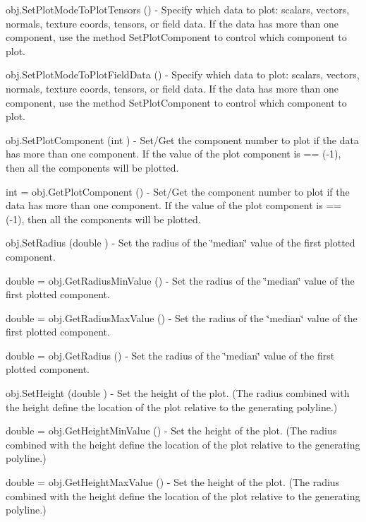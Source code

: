 \begin{DoxyItemize}
\item {\ttfamily obj.\-Set\-Plot\-Mode\-To\-Plot\-Tensors ()} -\/ Specify which data to plot\-: scalars, vectors, normals, texture coords, tensors, or field data. If the data has more than one component, use the method Set\-Plot\-Component to control which component to plot.  
\item {\ttfamily obj.\-Set\-Plot\-Mode\-To\-Plot\-Field\-Data ()} -\/ Specify which data to plot\-: scalars, vectors, normals, texture coords, tensors, or field data. If the data has more than one component, use the method Set\-Plot\-Component to control which component to plot.  
\item {\ttfamily obj.\-Set\-Plot\-Component (int )} -\/ Set/\-Get the component number to plot if the data has more than one component. If the value of the plot component is == (-\/1), then all the components will be plotted.  
\item {\ttfamily int = obj.\-Get\-Plot\-Component ()} -\/ Set/\-Get the component number to plot if the data has more than one component. If the value of the plot component is == (-\/1), then all the components will be plotted.  
\item {\ttfamily obj.\-Set\-Radius (double )} -\/ Set the radius of the \char`\"{}median\char`\"{} value of the first plotted component.  
\item {\ttfamily double = obj.\-Get\-Radius\-Min\-Value ()} -\/ Set the radius of the \char`\"{}median\char`\"{} value of the first plotted component.  
\item {\ttfamily double = obj.\-Get\-Radius\-Max\-Value ()} -\/ Set the radius of the \char`\"{}median\char`\"{} value of the first plotted component.  
\item {\ttfamily double = obj.\-Get\-Radius ()} -\/ Set the radius of the \char`\"{}median\char`\"{} value of the first plotted component.  
\item {\ttfamily obj.\-Set\-Height (double )} -\/ Set the height of the plot. (The radius combined with the height define the location of the plot relative to the generating polyline.)  
\item {\ttfamily double = obj.\-Get\-Height\-Min\-Value ()} -\/ Set the height of the plot. (The radius combined with the height define the location of the plot relative to the generating polyline.)  
\item {\ttfamily double = obj.\-Get\-Height\-Max\-Value ()} -\/ Set the height of the plot. (The radius combined with the height define the location of the plot relative to the generating polyline.)  

\end{DoxyItemize}
